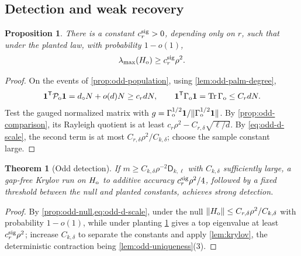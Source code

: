 \documentclass[11pt]{article}
\newtheorem{theorem}{Theorem}[section]
\newtheorem{proposition}[proposition]{Proposition}
\theoremstyle{definition}
\theoremstyle{remark}
\newcommand{\1}{\mathbf 1}
\newcommand{\cP}{\mathcal P}
\newcommand{\Dkl}{\mathsf D_{k,\ell}}
\DeclareMathOperator{\Tr}{Tr}
\numberwithin{equation}{section}
\begin{document}
\subsection{Detection and weak recovery}

\begin{proposition}\label{prop:odd-witness}
There is a constant $c_r^{\rm sig}>0$, depending only on $r$, such that
under the planted law, with probability $1-o(1)$,
\begin{equation}\label{eq:odd-witness}
 \lambda_{\max}(H_{\rm o})\ge c_r^{\rm sig}\rho^2.
\end{equation}
\end{proposition}
\begin{proof}
On the events of \cref{prop:odd-population}, using
\cref{lem:odd-palm-degree},
\[
 \1^{\mathsf T}\cP_{\rm o}\1
 =d_\circ N+o(d)N\ge c_rdN,
 \qquad
 \1^{\mathsf T}\Gamma_{\rm o}\1
 =\Tr\Gamma_{\rm o}\le C_rdN.
\]
Test the gauged normalized matrix with
$g=\Gamma_{\rm o}^{1/2}\1/\|\Gamma_{\rm o}^{1/2}\1\|$.
By \cref{prop:odd-comparison}, its Rayleigh quotient is at least
$c_r\rho^2-C_{r,\delta}\sqrt{\ell/d}$.  By
\cref{eq:odd-d-scale}, the second term is at most
$C_{r,\delta}\rho^2/C_{k,\delta}$; choose the sample constant large.
\end{proof}

\begin{theorem}[Odd detection]\label{thm:odd-detection}
If $m\ge C_{k,\delta}\rho^{-2}\Dkl$ with $C_{k,\delta}$ sufficiently
large, a gap-free Krylov run on $H_{\rm o}$
to additive accuracy $c_r^{\rm sig}\rho^2/4$, followed by a fixed
threshold between the null and planted constants, achieves strong
detection.
\end{theorem}
\begin{proof}
By \cref{prop:odd-null,eq:odd-d-scale}, under the null
$\|H_{\rm o}\|\le C_{r,\delta}\rho^2/C_{k,\delta}$ with probability
$1-o(1)$, while under planting \cref{prop:odd-witness} gives a top
eigenvalue at least $c_r^{\rm sig}\rho^2$; increase $C_{k,\delta}$ to
separate the constants and apply \cref{lem:krylov}, the deterministic
contraction being \cref{lem:odd-uniqueness}(3).
\end{proof}
\end{document}
